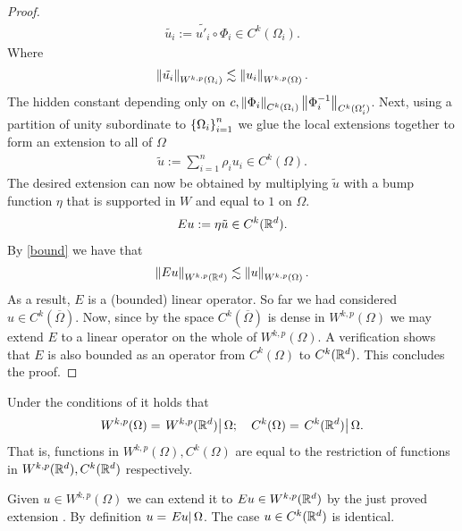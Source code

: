 \documentclass[
    a4paper,
    DIV=14,
    abstract=true,
    numbers=noenddot
]{scrartcl}
\begin{document}
\begin{proof}
	\begin{align*}
		\tilde{u_i}:= \widetilde{u'_i} \circ \Phi_i \in C^k(\Omega_i).
	\end{align*}
	Where
	\begin{align}\label{bound}
		\left\lVert \tilde{u_i} \right\rVert_{W^{k,p}(\Omega_i)}\lesssim  \left\lVert u_i \right\rVert_{W^{k,p}(\Omega)}.
	\end{align}
	The hidden constant depending only on  $c,\left\lVert \Phi_i \right\rVert_{C^k(\Omega_i)}\left\lVert \Phi_i^{-1} \right\rVert_{C^k(\Omega_i')}$. Next, using a partition of unity subordinate to $\left\{\Omega_i\right\}_{i=1}^n $ we glue the local extensions together to form an extension to all of $\Omega$
	\begin{align*}
		\tilde{u}:= \sum_{i=1}^n \rho _i{u_i} \in C^k(\Omega).
	\end{align*}
	The desired extension can now be obtained by multiplying $\tilde{u}$ with a bump function $\eta$ that is supported in $W$ and equal to  $1$ on  $\Omega$.
	\begin{align*}
		Eu := \eta \tilde{u} \in C^k(\mathbb{R}^d).
	\end{align*}
	By \eqref{bound} we have that
	\begin{align*}
		\left\lVert E u \right\rVert_{W^{k,p}(\mathbb{R}^d)} \lesssim  \left\lVert u \right\rVert_{W^{k,p}(\Omega)}.
	\end{align*}
	As a result, $E$ is a (bounded) linear operator. So far we had considered $u \in  C^k(\overline{\Omega})$. Now, since by  the space  $C^k(\overline{\Omega})$ is dense in $W^{k,p}(\Omega)$ we may extend  $E$ to a linear operator on the whole of $W^{k,p}(\Omega)$. A verification shows that $E$ is also bounded as an operator from  $C^k(\Omega)$ to  $C^k(\mathbb{R}^d)$. This concludes the proof.
\end{proof}
\begin{exercise}[Restriction]\label{restriction} Under the conditions of  it holds that
	\begin{align*}
		W^{k,p}(\Omega)= \left.W^{k,p}(\mathbb{R}^d)\right|{\Omega}; \quad C^{k}(\Omega)= \left.C^{k}(\mathbb{R}^d)\right|{\Omega}.
	\end{align*}
	That is, functions in $W^{k,p}(\Omega),C^{k}(\Omega)$ are equal to the restriction of functions in $W^{k,p}(\mathbb{R}^d),C^{k}(\mathbb{R}^d)$ respectively.
\end{exercise}
\begin{hint}
	Given $u \in W^{k,p}(\Omega)$ we can extend it to $Eu \in W^{k,p}(\mathbb{R}^d)$ by the just proved extension . By definition $u= \left.Eu\right|{\Omega}$. The case $u \in C^k(\mathbb{R}^d)$ is identical.
\end{hint}
\end{document}
